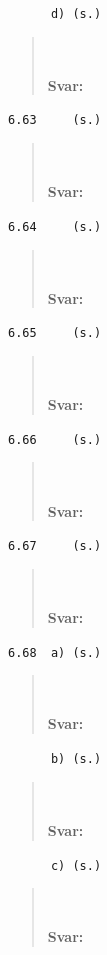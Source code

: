 \documentclass[a4paper]{article}
\newcommand{\tskcol}[1]{\textcolor{tskcol}{#1}}
\begin{document}
	\texttt{\tskcol{~~~~~~d) (s.)}}
	\begin{quotation}
		\noindent
		\\ \\
		\textbf{Svar:}
	\end{quotation}
	
	\texttt{\tskcol{6.63~~~~ (s.)}}
	\begin{quotation}
		\noindent
		\\ \\
		\textbf{Svar:}
	\end{quotation}
	
	\texttt{\tskcol{6.64~~~~ (s.)}}
	\begin{quotation}
		\noindent
		\\ \\
		\textbf{Svar:}
	\end{quotation}
	
	\texttt{\tskcol{6.65~~~~ (s.)}}
	\begin{quotation}
		\noindent
		\\ \\
		\textbf{Svar:}
	\end{quotation}
	
	\texttt{\tskcol{6.66~~~~ (s.)}}
	\begin{quotation}
		\noindent
		\\ \\
		\textbf{Svar:}
	\end{quotation}
	
	\texttt{\tskcol{6.67~~~~ (s.)}}
	\begin{quotation}
		\noindent
		\\ \\
		\textbf{Svar:}
	\end{quotation}
	
	\texttt{\tskcol{6.68~~a) (s.)}}
	\begin{quotation}
		\noindent
		\\ \\
		\textbf{Svar:}
	\end{quotation}
	
	\texttt{\tskcol{~~~~~~b) (s.)}}
	\begin{quotation}
		\noindent
		\\ \\
		\textbf{Svar:}
	\end{quotation}
	
	\texttt{\tskcol{~~~~~~c) (s.)}}
	\begin{quotation}
		\noindent
		\\ \\
		\textbf{Svar:}
	\end{quotation}
\end{document}

